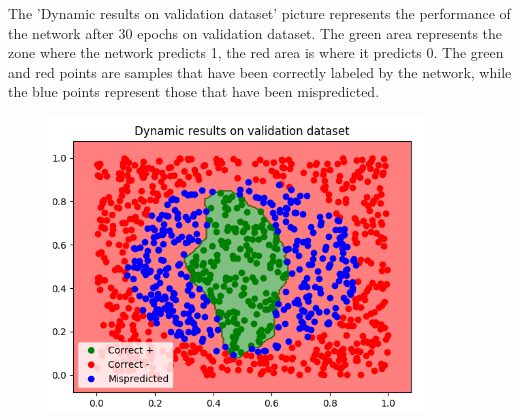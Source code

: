 \begin{minipage}{0.45\textwidth} 
	The 'Dynamic results on validation dataset' picture represents the performance of the network after 30 epochs on validation dataset. The green area represents the zone where the network predicts 1, the red area is where it predicts 0. The green and red points are samples that have been correctly labeled by the network, while the blue points represent those that have been mispredicted.
\end{minipage}
\begin{minipage}{0.5\textwidth} \raggedleft 
	\begin{figure}[H]
		\includegraphics[width=0.9\textwidth]{Images/30epochs.png}
		\centering
	\end{figure}
\end{minipage}


